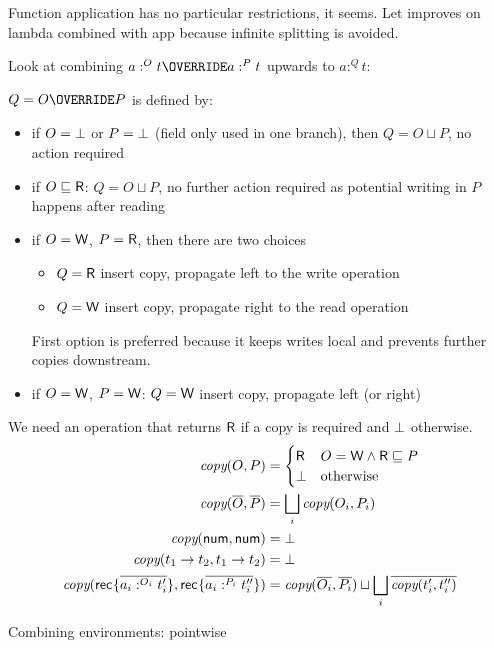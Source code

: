 \documentclass{llncs}
\begin{document}
Function application has no particular restrictions, it seems.
Let improves on lambda combined with app because infinite splitting is avoided.

Look at combining $a :^O t \OVERRIDE a:^P t$ upwards to $a : ^Q t$:

$Q= O \OVERRIDE P$ is defined by:
\begin{itemize}
\item if $O=\bot$ or $P=\bot$ (field only used in one branch), then $Q = O \sqcup P$, no
  action required
\item if $O\sqsubseteq \textsf{R}$: $Q = O \sqcup P$,
  no further action required as potential writing in $P$ happens after reading
\item if $O = \textsf{W}$, $P = \textsf{R}$, then there are two choices
  \begin{itemize}
  \item $Q = \textsf{R}$ insert copy, propagate left to the write operation
  \item $Q = \textsf{W}$ insert copy, propagate right to the read operation
  \end{itemize}
  First option is preferred because it keeps writes local and prevents
  further copies downstream.
\item if $O=\textsf{W}$, $P =\textsf{W}$: $Q = \textsf{W}$ insert copy,
  propagate left (or right)
\end{itemize}
We need an operation that returns $\textsf{R}$ if a copy is required and
$\bot$ otherwise.
\begin{align*}
  \textit{copy} (O, P) &=
                 \begin{cases}
                   \textsf{R} & O=\textsf{W} \wedge \textsf{R} \sqsubseteq P \\
                   \bot & \text{otherwise}
                 \end{cases}
  \\
  \textit{copy} (\overline{O}, \overline{P})
               &= \bigsqcup_i \textit{copy} (O_i, P_i)
  \\
  \textit{copy} (\textsf{num}, \textsf{num})
               & = \bot
  \\
  \textit{copy} (t_1 \to t_2, t_1 \to t_2)
               & = \bot
  \\
  \textit{copy} (\textsf{rec}^{{}}\{ \overline{a_i :^{O_i} t_i'}\}, \textsf{rec}^{{}}\{ \overline{a_i :^{P_i} t_i''}\})
  &=\textit{copy} (\overline{O_i}, \overline{P_i})
    \sqcup \bigsqcup_i \overline{\textit{copy} (t_i', t_i'')}
\end{align*}

Combining environments: pointwise
\end{document}
